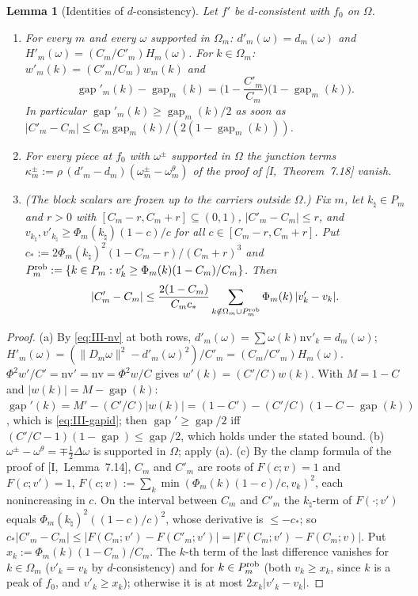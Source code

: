 \documentclass[10pt]{amsart}
\newtheorem{lemma}[theorem]{Lemma}
\theoremstyle{definition}
\theoremstyle{remark}
\newcommand{\gap}{\operatorname{gap}}
\begin{document}
\begin{lemma}[Identities of $d$-consistency]\label{lem:III-dcons}
Let $f'$ be $d$-consistent with $f_0$ on $\Omega$.
\begin{enumerate}
\item[(a)] For every $m$ and every $\omega$ supported in $\Omega_m$:
$d'_m(\omega)=d_m(\omega)$ and $H'_m(\omega)=(C_m/C'_m)H_m(\omega)$.  For
$k\in\Omega_m$: $w'_m(k)=(C'_m/C_m)w_m(k)$ and
\begin{equation}\label{eq:III-gapid}
 \gap'_m(k)-\gap_m(k)=\Big(1-\frac{C'_m}{C_m}\Big)\big(1-\gap_m(k)\big).
\end{equation}
In particular $\gap'_m(k)\ge\gap_m(k)/2$ as soon as
$|C'_m-C_m|\le C_m\gap_m(k)/(2(1-\gap_m(k)))$.
\item[(b)] For every piece at $f_0$ with $\omega^\pm$ supported in $\Omega$ the
junction terms $\kappa^\pm_m:=\rho\,(d'_m-d_m)(\omega^\pm_m-\omega^\theta_m)$ of
the proof of [I,~Theorem~7.18] vanish.
\item[(c)] \textup{(The block scalars are frozen up to the carriers outside
$\Omega$.)}  Fix $m$, let $k_\natural\in P_m$ and $r>0$ with
$[C_m-r,C_m+r]\subseteq(0,1)$, $|C'_m-C_m|\le r$, and
$v_{k_\natural},v'_{k_\natural}\ge\Phi_m(k_\natural)(1-c)/c$ for all $c\in
[C_m-r,C_m+r]$.  Put $c_*:=2\Phi_m(k_\natural)^2(1-C_m-r)/(C_m+r)^3$ and
$P^{\rm rob}_m:=\{k\in P_m:v'_k\ge\Phi_m(k)(1-C_m)/C_m\}$.  Then
\[
 |C'_m-C_m|\le\frac{2(1-C_m)}{C_mc_*}\sum_{k\notin\Omega_m\cup P^{\rm rob}_m}
 \Phi_m(k)\,|v'_k-v_k| .
\]
\end{enumerate}
\end{lemma}

\begin{proof}
(a) By \eqref{eq:III-nv} at both rows, $d'_m(\omega)=\sum\omega(k)\mathrm{nv}'_k=
d_m(\omega)$; $H'_m(\omega)=(\|D_m\omega\|^2-d'_m(\omega)^2)/C'_m=(C_m/C'_m)
H_m(\omega)$.  $\Phi^2w'/C'=\mathrm{nv}'=\mathrm{nv}=\Phi^2w/C$ gives
$w'(k)=(C'/C)w(k)$.  With $M=1-C$ and $|w(k)|=M-\gap(k)$:
$\gap'(k)=M'-(C'/C)|w(k)|=(1-C')-(C'/C)(1-C-\gap(k))$, which is
\eqref{eq:III-gapid}; then $\gap'\ge\gap/2$ iff
$(C'/C-1)(1-\gap)\le\gap/2$, which holds under the stated bound.
(b) $\omega^\pm-\omega^\theta=\mp\frac12\Delta\omega$ is supported in $\Omega$;
apply (a).
(c) By the clamp formula of the proof of [I,~Lemma~7.14], $C_m$ and $C'_m$ are
roots of $F(c;v)=1$ and $F(c;v')=1$, $F(c;v):=\sum_k\min(\Phi_m(k)(1-c)/c,
v_k)^2$, each nonincreasing in $c$.  On the interval between $C_m$ and $C'_m$
the $k_\natural$-term of $F(\cdot;v')$ equals $\Phi_m(k_\natural)^2((1-c)/c)^2$,
whose derivative is $\le-c_*$; so $c_*|C'_m-C_m|\le|F(C_m;v')-F(C'_m;v')|=
|F(C_m;v')-F(C_m;v)|$.  Put $x_k:=\Phi_m(k)(1-C_m)/C_m$.  The $k$-th term of
the last difference vanishes for $k\in\Omega_m$ ($v'_k=v_k$ by
$d$-consistency) and for $k\in P^{\rm rob}_m$ (both $v_k\ge x_k$, since $k$ is
a peak of $f_0$, and $v'_k\ge x_k$); otherwise it is at most $2x_k|v'_k-v_k|$.
\end{proof}
\end{document}
